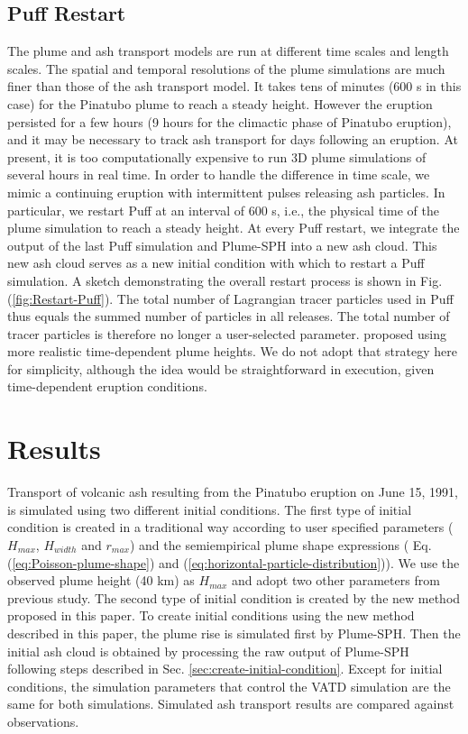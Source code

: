 \documentclass[utf8]{frontiersSCNS} %
\begin{document}
\subsection{Puff Restart}

The plume and ash transport models are run at different time scales and length scales. The spatial and temporal resolutions of the plume simulations are much finer than those of the ash transport model. It takes tens of minutes (600 s in this case) for the Pinatubo plume to reach a steady height. However the eruption persisted for a few hours (9 hours for the climactic phase of Pinatubo eruption), and it may be necessary to track ash transport for days following an eruption. At present, it is too computationally expensive to run 3D plume simulations of several hours in real time. In order to handle the difference in time scale, we mimic a continuing eruption with intermittent pulses releasing ash particles. In particular, we restart Puff at an interval of 600 s, i.e., the physical time of the plume simulation to reach a steady height. At every Puff restart, we integrate the output of the last Puff simulation and Plume-SPH into a new ash cloud. This new ash cloud serves as a new initial condition with which to restart a Puff simulation. A sketch demonstrating the overall restart process is shown in Fig. (\ref{fig:Restart-Puff}). The total number of Lagrangian tracer particles used in Puff thus equals the summed number of particles in all releases. The total number of tracer particles is therefore no longer a user-selected parameter. \citet{fero2008simulation} proposed using more realistic time-dependent plume heights. We do not adopt that strategy here for simplicity, although the idea would be straightforward in execution, given time-dependent eruption conditions.

\section{Results}

Transport of volcanic ash resulting from the Pinatubo eruption on June 15, 1991, is simulated using two different initial conditions.
The first type of initial condition is created in a traditional way according to user specified parameters ($H_{max}$, $H_{width}$ and $r_{max}$) and the semiempirical plume shape expressions ( Eq. (\ref{eq:Poisson-plume-shape}) and (\ref{eq:horizontal-particle-distribution})). We use the observed plume height (40 km) as $H_{max}$ and adopt two other parameters from previous study\citep{fero2008simulation}. The second type of initial condition is created by the new method proposed in this paper. To create initial conditions using the new method described in this paper, the plume rise is simulated first by Plume-SPH. Then the initial ash cloud is obtained by processing the raw output of Plume-SPH following steps described in Sec. \ref{sec:create-initial-condition}. Except for initial conditions, the simulation parameters that control the VATD simulation are the same for both simulations. Simulated ash transport results are compared against observations.
\end{document}
